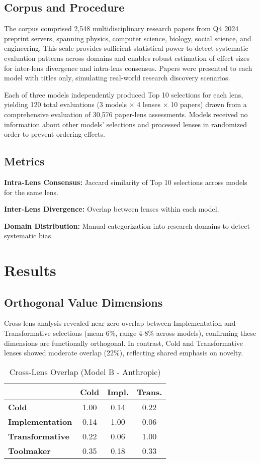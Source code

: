 \documentclass{article}
\begin{document}
\subsection{Corpus and Procedure}

The corpus comprised 2,548 multidisciplinary research papers from Q4 2024 preprint servers, spanning physics, computer science, biology, social science, and engineering. This scale provides sufficient statistical power to detect systematic evaluation patterns across domains and enables robust estimation of effect sizes for inter-lens divergence and intra-lens consensus. Papers were presented to each model with titles only, simulating real-world research discovery scenarios.

Each of three models independently produced Top 10 selections for each lens, yielding 120 total evaluations (3 models × 4 lenses × 10 papers) drawn from a comprehensive evaluation of 30,576 paper-lens assessments. Models received no information about other models' selections and processed lenses in randomized order to prevent ordering effects.

\subsection{Metrics}

\textbf{Intra-Lens Consensus:} Jaccard similarity of Top 10 selections across models for the same lens.

\textbf{Inter-Lens Divergence:} Overlap between lenses within each model.

\textbf{Domain Distribution:} Manual categorization into research domains to detect systematic bias.

\section{Results}

\subsection{Orthogonal Value Dimensions}

Cross-lens analysis revealed near-zero overlap between Implementation and Transformative selections (mean 6\%, range 4-8\% across models), confirming these dimensions are functionally orthogonal. In contrast, Cold and Transformative lenses showed moderate overlap (22\%), reflecting shared emphasis on novelty.

\begin{table}[htbp]
\centering
\caption{Cross-Lens Overlap (Model B - Anthropic)}
\label{tab:overlap}
\begin{tabular}{lccc}
\toprule
& \textbf{Cold} & \textbf{Impl.} & \textbf{Trans.} \\
\midrule
\textbf{Cold} & 1.00 & 0.14 & 0.22 \\
\textbf{Implementation} & 0.14 & 1.00 & 0.06 \\
\textbf{Transformative} & 0.22 & 0.06 & 1.00 \\
\textbf{Toolmaker} & 0.35 & 0.18 & 0.33 \\
\bottomrule
\end{tabular}
\end{table}
\end{document}

